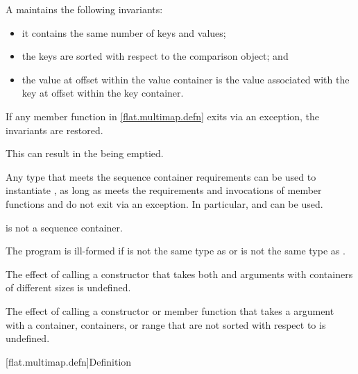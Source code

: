 \pnum
A  maintains the following invariants:
\begin{itemize}
\item
it contains the same number of keys and values;
\item
the keys are sorted with respect to the comparison object; and
\item
the value at offset  within the value container is the value
associated with the key at offset  within the key container.
\end{itemize}

\pnum
If any member function in \ref{flat.multimap.defn} exits via an exception,
the invariants are restored.
\begin{note}
This can result in the  being emptied.
\end{note}

\pnum
Any type 
that meets the sequence container requirements
can be used to instantiate ,
as long as
 meets the  requirements and
invocations of
member functions  and  do not exit via an exception.
In particular,
 and  can be used.
\begin{note}
 is not a sequence container.
\end{note}

\pnum
The program is ill-formed if
 is not the same type as  or
 is not the same type as .

\pnum
The effect of calling a constructor
that takes both  and
 arguments
with containers of different sizes is undefined.

\pnum
The effect of calling a constructor or member function
that takes a  argument
with a container, containers, or range
that are not sorted with respect to  is undefined.

[flat.multimap.defn]{Definition}

